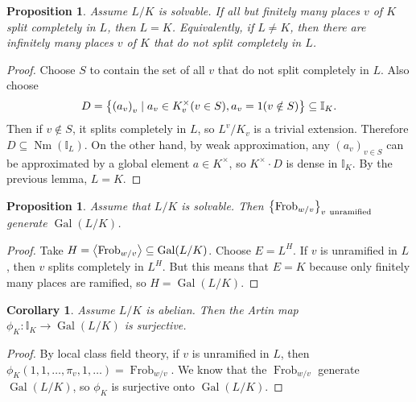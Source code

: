 \documentclass[leqno, openany]{memoir}
\newtheorem{cor}[thm]{Corollary}
\newtheorem{prop}[thm]{Proposition}
\theoremstyle{definition}
\theoremstyle{remark}
\theoremstyle{plain}
\theoremstyle{definition}
\theoremstyle{remark}
\newcommand{\I}{\mathbb{I}}
\DeclareMathOperator{\Gal}{Gal}
\DeclareMathOperator{\Nm}{Nm}
\DeclareMathOperator{\Frob}{Frob}
\begin{document}
\begin{prop}
    Assume $L/K$ is solvable. If all but finitely many places $v$ of $K$ split completely in $L$, then $L = K$. Equivalently, if $L \neq K$, then there are infinitely many places $v$ of $K$ that do not split completely in $L$.
\end{prop}

\begin{proof}
    Choose $S$ to contain the set of all $v$ that do not split completely in $L$. Also choose
    \[ D = \qty{{(a_v)}_v \mid a_v \in K_v^{\times} (v \in S), a_v = 1 (v \notin S)} \subseteq \I_K. \]
    Then if $v \notin S$, it splits completely in $L$, so $L^v / K_v$ is a trivial extension. Therefore $D \subseteq \Nm(\I_L)$. On the other hand, by weak approximation, any ${(a_v)}_{v \in S}$ can be approximated by a global element $a \in K^{\times}$, so $K^{\times} \cdot D$ is dense in $\I_K$. By the previous lemma, $L = K$.
\end{proof}

\begin{prop}
    Assume that $L/K$ is solvable. Then $\qty{\Frob_{w/v}}_{v\ \text{unramified}}$ generate $\Gal(L/K)$.
\end{prop}

\begin{proof}
    Take $H = \ev{\Frob_{w/v}} \subseteq \Gal(L/K)$. Choose $E = L^H$. If $v$ is unramified in $L$, then $v$ splits completely in $L^H$. But this means that $E = K$ because only finitely many places are ramified, so $H = \Gal(L/K)$.
\end{proof}

\begin{cor}
    Assume $L/K$ is abelian. Then the Artin map $\phi_K \colon \I_K \to \Gal(L/K)$ is surjective.
\end{cor}

\begin{proof}
    By local class field theory, if $v$ is unramified in $L$, then $\phi_K (1, 1, \ldots, \pi_v, 1, \ldots) = \Frob_{w/v}$. We know that the $\Frob_{w/v}$ generate $\Gal(L/K)$, so $\phi_K$ is surjective onto $\Gal(L/K)$.
\end{proof}
\end{document}
